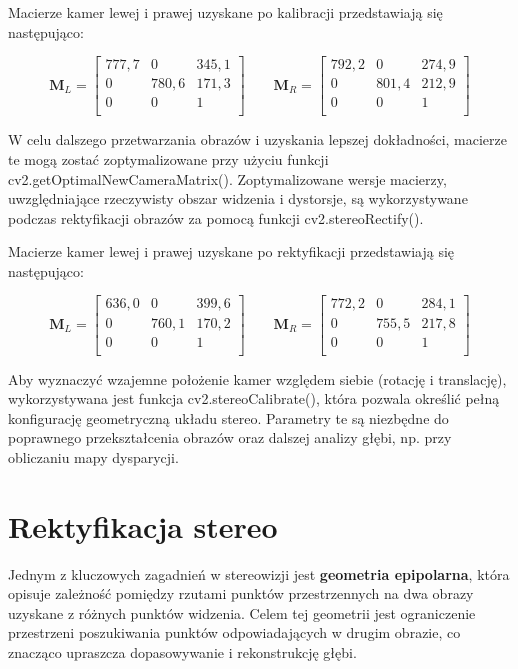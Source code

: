 \documentclass[magisterska]{pracadypl}
\begin{document}
Macierze kamer lewej i prawej uzyskane po kalibracji przedstawiają się następująco:

\[
\mathbf{M}_L =
\begin{bmatrix}
777,7 & 0 & 345,1 \\
0 & 780,6 & 171,3 \\
0 & 0 & 1 \\
\end{bmatrix}
\qquad
\mathbf{M}_R =
\begin{bmatrix}
792,2 & 0 & 274,9 \\
0 & 801,4 & 212,9 \\
0 & 0 & 1 \\
\end{bmatrix}
\]

W celu dalszego przetwarzania obrazów i uzyskania lepszej dokładności, macierze te mogą zostać zoptymalizowane przy użyciu funkcji cv2.getOptimalNewCameraMatrix(). Zoptymalizowane wersje macierzy, uwzględniające rzeczywisty obszar widzenia i dystorsje, są wykorzystywane podczas rektyfikacji obrazów za pomocą funkcji cv2.stereoRectify().

Macierze kamer lewej i prawej uzyskane po rektyfikacji przedstawiają się następująco:

\[
\mathbf{M}_L =
\begin{bmatrix}
636,0 & 0 & 399,6 \\
0 & 760,1 & 170,2 \\
0 & 0 & 1 \\
\end{bmatrix}
\qquad
\mathbf{M}_R =
\begin{bmatrix}
772,2 & 0 & 284,1 \\
0 & 755,5 & 217,8 \\
0 & 0 & 1 \\
\end{bmatrix}
\]

Aby wyznaczyć wzajemne położenie kamer względem siebie (rotację i translację), wykorzystywana jest funkcja cv2.stereoCalibrate(), która pozwala określić pełną konfigurację geometryczną układu stereo. Parametry te są niezbędne do poprawnego przekształcenia obrazów oraz dalszej analizy głębi, np. przy obliczaniu mapy dysparycji.

\section{Rektyfikacja stereo}

Jednym z kluczowych zagadnień w stereowizji jest \textbf{geometria epipolarna}, która opisuje zależność pomiędzy rzutami punktów przestrzennych na dwa obrazy uzyskane z różnych punktów widzenia. Celem tej geometrii jest ograniczenie przestrzeni poszukiwania punktów odpowiadających w drugim obrazie, co znacząco upraszcza dopasowywanie i rekonstrukcję głębi.
\end{document}
